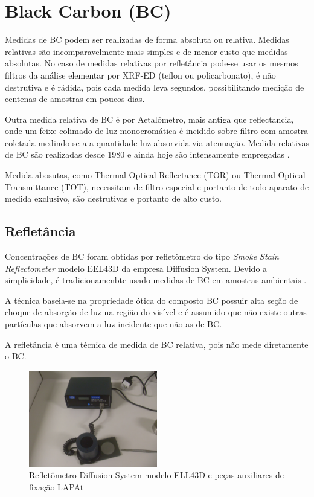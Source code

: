 \section{Black Carbon (BC)}

Medidas de BC podem ser realizadas de forma absoluta ou relativa.
Medidas relativas são incomparavelmente mais simples 
e de menor custo que medidas absolutas. 
No caso de medidas relativas por refletância pode-se usar os mesmos filtros 
da análise elementar por XRF-ED (teflon ou policarbonato), é não destrutiva e 
é rádida, pois cada medida leva segundos, possibilitando medição de centenas de 
amostras em poucos dias.

Outra medida relativa de BC é por Aetalômetro, mais antiga que reflectancia,
onde um feixe colimado de  luz monocromática é incidido sobre
filtro com amostra coletada medindo-se a a quantidade luz absorvida via 
atenuação. Medida relativas de BC são realizadas desde 1980 e ainda hoje são 
intensamente empregadas \citep{targino2016}.

Medida abosutas, como Thermal Optical-Reflectance (TOR) ou 
Thermal-Optical Transmittance (TOT), necessitam de filtro especial e portanto de 
todo aparato de medida exclusivo, são destrutivas e portanto de alto custo.

\subsection{Refletância}

Concentrações de BC foram obtidas por refletômetro do tipo 
\textit{Smoke Stain Reflectometer} modelo EEL43D da empresa Diffusion System.
Devido a simplicidade, é tradicionamenbte usado medidas de BC em 
amostras ambientais \citep{lack2014}. 

A técnica baseia-se na propriedade ótica do composto BC possuir alta seção 
de choque 
de absorção de luz na região do visível e é assumido que não existe outras 
partículas que absorvem a luz incidente que não as de BC.

A refletância é uma técnica de medida de BC relativa, pois não mede diretamente
o BC. 

\begin{figure}[H]
  \centering
  \includegraphics[width=0.5\textwidth]{../inputs/images/refletometro.jpg}
  \caption{Refletômetro Diffusion System modelo ELL43D 
           e peças auxiliares de fixação LAPAt}
\end{figure}

